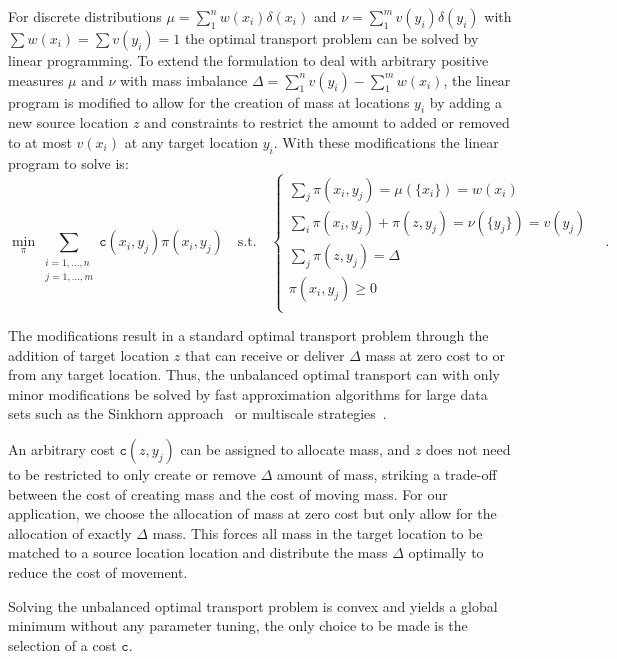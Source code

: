 \documentclass{llncs}
\newcommand{\cost}[0]{\mathtt{c}}
\newcommand{\coupling}[0]{\pi}
\begin{document}
For discrete distributions $\mu = \sum_1^n w(x_i) \delta(x_i)$ and $ \nu =
\sum_1^m v(y_i) \delta(y_i)$ with $\sum w(x_i) = \sum v(y_i) = 1$ the optimal
transport problem can be solved by linear programming. To extend the
formulation to deal with arbitrary positive measures $\mu$ and $\nu$ with mass
imbalance  $\Delta = \sum_1^n v(y_i)  - \sum_1^m w(x_i)$, the linear program is
modified to allow for the creation of mass at locations $y_i$ by adding a new
source location $z$ and constraints to restrict the amount to added or removed
to at most $v(x_i)$ at any target location $y_i$. With these modifications the
linear program to solve is: 
\begin{equation}
\min_\coupling \sum_{\substack{i=1,\dots,n\\ j=1,\dots,m}} 
      \cost(x_i, y_j) \coupling(x_i, y_j) \quad \text{s.t.}\quad 
\begin{cases}
  \sum_j \coupling(x_i, y_j)  = \mu(\{x_i\}) = w(x_i) & \\ 
  \sum_i \coupling(x_i, y_j) + \coupling(z, y_j)= \nu(\{y_j\}) = v(y_j) & \\
  \sum_j \coupling(z, y_j)  = \Delta \\
  \coupling(x_i, y_j) \ge 0 \\
\end{cases}\,.
\label{eq:unbalanced}
\end{equation} 

The modifications result in a standard optimal transport problem through the
addition of target location $z$ that can receive or deliver $\Delta$ mass at
zero cost to or from any target location.  Thus, the unbalanced optimal
transport can with only minor modifications be solved by fast approximation
algorithms for large data sets such as the Sinkhorn
approach~\cite{cuturi2013sinkhorn} or multiscale
strategies~\cite{gerber2017multiscale}. 

An arbitrary cost $\cost(z, y_j)$ can be assigned to allocate mass, and $z$
does not need to be restricted to only create or remove $\Delta$ amount of
mass, striking a trade-off between the cost of creating mass and the cost of
moving mass. For our application, we choose the allocation of mass at zero cost
but only allow for the allocation of exactly $\Delta$ mass. This forces all
mass in the target location to be matched to a source location location and
distribute the mass $\Delta$ optimally to reduce the cost of movement.

Solving the unbalanced optimal transport problem is convex and yields a global
minimum without any parameter tuning, the only choice to be made is the
selection of a cost $\cost$.
\end{document}

